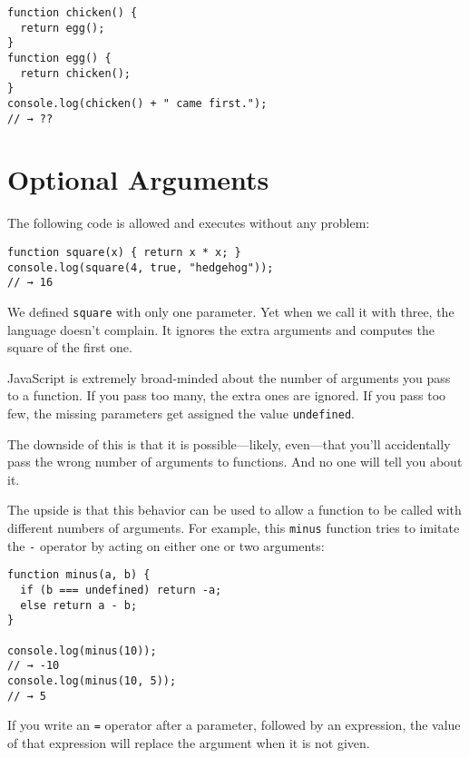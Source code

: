 \begin{lstlisting}
function chicken() {
  return egg();
}
function egg() {
  return chicken();
}
console.log(chicken() + " came first.");
// → ??
\end{lstlisting}
\noindent

\section{Optional Arguments}

The following code is allowed and executes without any problem:

\begin{lstlisting}
function square(x) { return x * x; }
console.log(square(4, true, "hedgehog"));
// → 16
\end{lstlisting}
\noindent

We defined \lstinline`square` with only one parameter. Yet when we call it with three, the language doesn't complain. It ignores the extra arguments and computes the square of the first one.

JavaScript is extremely broad-minded about the number of arguments you pass to a function. If you pass too many, the extra ones are ignored. If you pass too few, the missing parameters get assigned the value \lstinline`undefined`.

The downside of this is that it is possible—likely, even—that you'll accidentally pass the wrong number of arguments to functions. And no one will tell you about it.

The upside is that this behavior can be used to allow a function to be called with different numbers of arguments. For example, this \lstinline`minus` function tries to imitate the \lstinline`-` operator by acting on either one or two arguments:

\begin{lstlisting}
function minus(a, b) {
  if (b === undefined) return -a;
  else return a - b;
}

console.log(minus(10));
// → -10
console.log(minus(10, 5));
// → 5
\end{lstlisting}
\noindent{}

\label{functions.power}If you write an \lstinline`=` operator after a parameter, followed by an expression, the value of that expression will replace the argument when it is not given.

